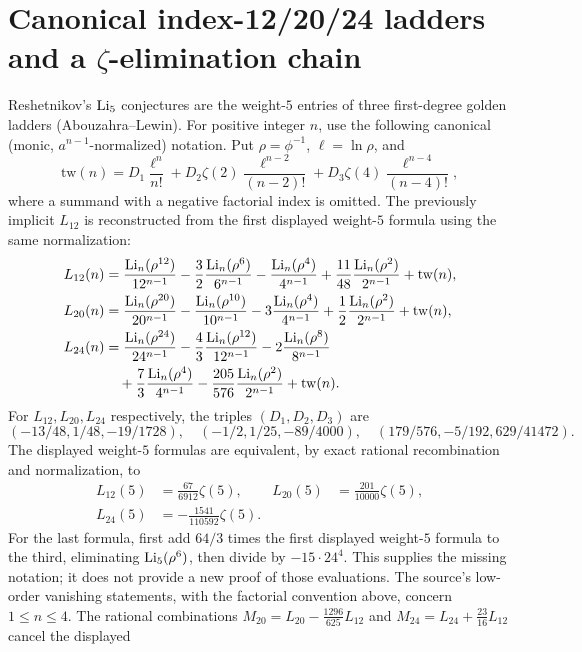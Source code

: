 \section{Canonical index-12/20/24 ladders and a $\zeta$-elimination chain}
Reshetnikov's $\operatorname{Li}_5$ conjectures are the weight-$5$ entries of three first-degree golden ladders (Abouzahra--Lewin).
For positive integer $n$, use the following canonical
(monic, $a^{n-1}$-normalized) notation. Put $\rho=\phi^{-1}$,
$\ell=\ln\rho$, and
\[
\mathrm{tw}(n)=D_1\frac{\ell^n}{n!}
 +D_2\zeta(2)\frac{\ell^{n-2}}{(n-2)!}
 +D_3\zeta(4)\frac{\ell^{n-4}}{(n-4)!},
\]
where a summand with a negative factorial index is omitted.
The previously implicit $L_{12}$ is reconstructed from the first
displayed weight-$5$ formula using the same normalization:
\begin{align*}
L_{12}(n)&=\frac{\operatorname{Li}_n(\rho^{12})}{12^{n-1}}
-\frac32\frac{\operatorname{Li}_n(\rho^6)}{6^{n-1}}
-\frac{\operatorname{Li}_n(\rho^4)}{4^{n-1}}
+\frac{11}{48}\frac{\operatorname{Li}_n(\rho^2)}{2^{n-1}}+\mathrm{tw}(n),\\
L_{20}(n)&=\frac{\operatorname{Li}_n(\rho^{20})}{20^{n-1}}
-\frac{\operatorname{Li}_n(\rho^{10})}{10^{n-1}}-3\frac{\operatorname{Li}_n(\rho^4)}{4^{n-1}}
+\frac12\frac{\operatorname{Li}_n(\rho^2)}{2^{n-1}}+\mathrm{tw}(n),\\
L_{24}(n)&=\frac{\operatorname{Li}_n(\rho^{24})}{24^{n-1}}
-\frac43\frac{\operatorname{Li}_n(\rho^{12})}{12^{n-1}}
-2\frac{\operatorname{Li}_n(\rho^8)}{8^{n-1}}\\
&\quad+\frac73\frac{\operatorname{Li}_n(\rho^4)}{4^{n-1}}
-\frac{205}{576}\frac{\operatorname{Li}_n(\rho^2)}{2^{n-1}}+\mathrm{tw}(n).
\end{align*}
For $L_{12},L_{20},L_{24}$ respectively, the triples $(D_1,D_2,D_3)$ are
\[
(-13/48,1/48,-19/1728),\quad
(-1/2,1/25,-89/4000),\quad
(179/576,-5/192,629/41472).
\]
The displayed weight-$5$ formulas are equivalent, by exact rational
recombination and normalization, to
\[
\begin{aligned}
L_{12}(5)&=\frac{67}{6912}\zeta(5),&
L_{20}(5)&=\frac{201}{10000}\zeta(5),\\
L_{24}(5)&=-\frac{1541}{110592}\zeta(5).
\end{aligned}
\]
For the last formula, first add $64/3$ times the first displayed
weight-$5$ formula to the third, eliminating $\operatorname{Li}_5(\rho^6)$, then
divide by $-15\cdot24^4$.
This supplies the missing notation; it does not provide a new proof of
those evaluations. The source's low-order vanishing statements, with the
factorial convention above, concern $1\le n\le4$.
The rational combinations
$M_{20}=L_{20}-\tfrac{1296}{625}L_{12}$ and
$M_{24}=L_{24}+\tfrac{23}{16}L_{12}$ cancel the displayed
